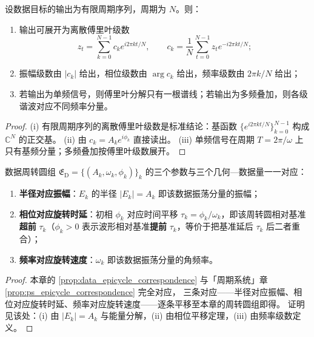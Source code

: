 \begin{theorem}[由数据构建周期级数]\label{thm:data_series_reconstruction}
设数据目标的输出为有限周期序列，周期为 $N$。则：
\begin{enumerate}[label=(\roman*)]
    \item 输出可展开为离散傅里叶级数
    \[
    z_t=\sum_{k=0}^{N-1}c_k e^{i2\pi kt/N},\qquad
    c_k=\frac1N\sum_{t=0}^{N-1}z_t e^{-i2\pi kt/N};
    \]
    \item 振幅级数由 $|c_k|$ 给出，相位级数由 $\arg c_k$ 给出，频率级数由 $2\pi k/N$ 给出；
    \item 若输出为单频信号，则傅里叶分解只有一根谱线；若输出为多频叠加，则各级谐波对应不同频率分量。
\end{enumerate}
\end{theorem}

\begin{proof}
(i) 有限周期序列的离散傅里叶级数是标准结论：基函数 $\{e^{i2\pi kt/N}\}_{k=0}^{N-1}$ 构成 $\mathbb C^N$ 的正交基。
(ii) 由 $c_k=A_k e^{i\phi_k}$ 直接读出。
(iii) 单频信号在周期 $T=2\pi/\omega$ 上只有基频分量；多频叠加按傅里叶级数展开。
\end{proof}

\begin{proposition}\label{prop:data_epicycle_correspondence}
数据周转圆组 $\mathfrak E_{\mathrm{D}}=\{(A_k,\omega_k,\phi_k)\}_{k}$ 的三个参数与三个几何—数据量一一对应：
\begin{enumerate}[label=(\roman*)]
    \item \textbf{半径对应振幅}：$E_k$ 的半径 $|E_k|=A_k$ 即该数据振荡分量的振幅；
    \item \textbf{相位对应旋转时延}：初相 $\phi_k$ 对应时间平移 $\tau_k=\phi_k/\omega_k$，即该周转圆相对基准\textbf{超前} $\tau_k$（$\phi_k>0$ 表示波形相对基准\textbf{提前} $\tau_k$，等价于把基准延后 $\tau_k$ 后二者重合）；
    \item \textbf{频率对应旋转速度}：$\omega_k$ 即该数据振荡分量的角频率。
\end{enumerate}
\end{proposition}

\begin{proof}
本章的 \cref{prop:data_epicycle_correspondence} 与「周期系统」章 \cref{prop:ps_epicycle_correspondence} 完全对应，
三条对应——半径对应振幅、相位对应旋转时延、频率对应旋转速度——逐条平移至本章的周转圆组即得。
证明见该处：(i) 由 $|E_k|=A_k$ 与能量分解，(ii) 由相位平移定理，(iii) 由频率级数定义。
\end{proof}

